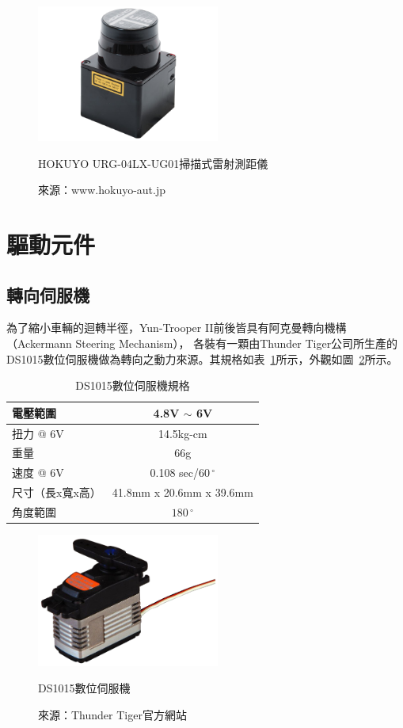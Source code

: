 \begin{figure}[h!]
	\centering
	\includegraphics[width=6cm]{figures/hardware/URG-04LX-UG01}
	\caption{HOKUYO URG-04LX-UG01掃描式雷射測距儀}
	\caption*{來源：www.hokuyo-aut.jp}
	\label{f:urg}
\end{figure}

\section{驅動元件}

\subsection{轉向伺服機}
為了縮小車輛的迴轉半徑，Yun-Trooper II前後皆具有阿克曼轉向機構（Ackermann Steering Mechanism），
各裝有一顆由Thunder Tiger公司所生產的DS1015數位伺服機做為轉向之動力來源。其規格如表~\ref{t:ds1015-specs}所示，外觀如圖~\ref{f:ds1015}所示。

\begin{table}[h!]
	\centering
	\caption{DS1015數位伺服機規格}
	\label{t:ds1015-specs}
	\begin{tabular}{ | l | c |}
		\hline
		電壓範圍 & 4.8V $\sim$ 6V \\ \hline
		扭力 @ 6V & 14.5kg-cm \\ \hline
		重量 & 66g \\ \hline
		速度 @ 6V & 0.108 sec/$60\,^{\circ}$ \\ \hline
		尺寸（長x寬x高） & 41.8mm x 20.6mm x 39.6mm \\ \hline
		角度範圍 & $180\,^{\circ}$ \\
		\hline
	\end{tabular}
\end{table}

\begin{figure}[h!]
	\centering
	\includegraphics[width=6cm]{figures/hardware/DS1015}
	\caption{DS1015數位伺服機}
	\caption*{來源：Thunder Tiger官方網站}
	\label{f:ds1015}
\end{figure}


